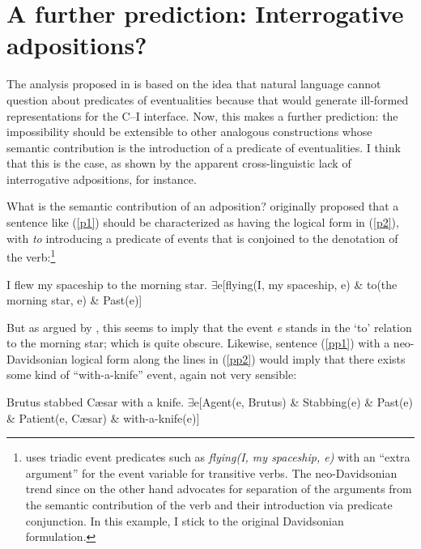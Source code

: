 \documentclass[output=paper]{langsci/langscibook}
\begin{document}
\section{A further prediction: Interrogative adpositions?}
\label{sec:prediction}
The analysis proposed in  is based on the idea that natural
language cannot question about predicates of eventualities because that would
generate ill-formed representations for the C--I interface. Now, this makes a
further prediction: the impossibility should be extensible to other analogous
constructions whose semantic contribution is the introduction of a predicate of
eventualities. I think that this is the case, as shown by the apparent
cross-linguistic lack of interrogative adpositions, for instance.

What is the semantic contribution of an adposition? \citet{Davidson1967}
originally proposed that a sentence like (\ref{p1}) should be
characterized as having the logical form in (\ref{p2}), with \emph{to}
introducing a predicate of events that is conjoined to the denotation of the
verb:\footnote{\citet{Davidson1967} uses triadic event predicates such as
    \emph{flying(I, my spaceship, e)} with an \enquote{extra argument} for the
    event variable for transitive verbs.  The neo-Davidsonian trend since
    \citet{castaneda1967} on the other hand advocates for separation of the
    arguments from the semantic contribution of the verb and their introduction
    via predicate conjunction. In this example, I stick to the original
Davidsonian formulation.}

\begin{exe}
\ex
\begin{xlista}
\ex \label{p1} I flew my spaceship to the morning star.
\ex \label{p2} $\exists$e[flying(I, my spaceship, e) \& to(the morning star, e) \& Past(e)]
\end{xlista}
\end{exe}

But as argued by \citet{larson.segal1995}, this seems to imply that the event
\emph{e} stands in the `to' relation to the morning star; which is quite
obscure. Likewise, sentence (\ref{pp1}) with a neo-Davidsonian logical form
along the lines in (\ref{pp2}) would imply that there exists some kind of
``with-a-knife'' event, again not very sensible:

\begin{exe}
\ex
\begin{xlista}
\ex \label{pp1} Brutus stabbed C\ae{}sar with a knife.
\ex \label{pp2} $\exists$e[Agent(e, Brutus) \& Stabbing(e) \& Past(e) \& Patient(e, C\ae{}sar) \& with-a-knife(e)]
\end{xlista}
\end{exe}
\end{document}
